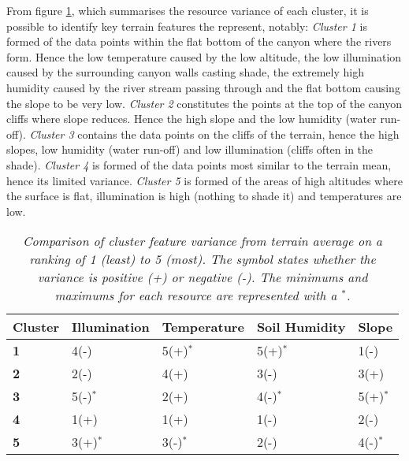 From figure \ref{tab:clustering_test_cluster_variance}, which summarises the resource variance of each cluster, it is possible to identify key terrain features the represent, notably: \textit{Cluster 1} is formed of the data points within the flat bottom of the canyon where the rivers form. Hence the low temperature caused by the low altitude, the low illumination caused by the surrounding canyon walls casting shade, the extremely high humidity caused by the river stream passing through and the flat bottom causing the slope to be very low. \textit{Cluster 2} constitutes the points at the top of the canyon cliffs where slope reduces. Hence the high slope and the low humidity (water run-off). \textit{Cluster 3} contains the data points on the cliffs of the terrain, hence the high slopes, low humidity (water run-off) and low illumination (cliffs often in the shade). \textit{Cluster 4} is formed of the data points most similar to the terrain mean, hence its limited variance. \textit{Cluster 5} is formed of the areas of high altitudes where the surface is flat, illumination is high (nothing to shade it) and temperatures are low.\\

\begin{table}[]
  \centering
	    \begin{tabular}{|p{3cm}|p{3cm}|p{3cm}|p{3cm}|p{3cm}|}
		\hline	
  	    \textbf{Cluster} &  \textbf{Illumination} & \textbf{Temperature} & \textbf{Soil Humidity} & \textbf{Slope} \\
		\hline
		\textbf{1} & 4(-) & 5(+)$^{*}$ & 5(+)$^{*}$ & 1(-) \\
		\hline
		\textbf{2} & 2(-) & 4(+) & 3(-) & 3(+) \\
		\hline
		\textbf{3} & 5(-)$^{*}$ & 2(+) & 4(-)$^{*}$ & 5(+)$^{*}$ \\
		\hline
		\textbf{4} & 1(+) & 1(+) & 1(-) & 2(-) \\
		\hline
		\textbf{5} & 3(+)$^{*}$ & 3(-)$^{*}$ & 2(-) & 4(-)$^{*}$ \\
		\hline
		\end{tabular}
		\caption{\textit{Comparison of cluster feature variance from terrain average on a ranking of 1 (least) to 5 (most). The symbol states whether the variance is positive (+) or negative (-). The minimums and maximums for each resource are represented with a $^{*}$.} }
	  \label{tab:clustering_test_cluster_variance}
\end{table}